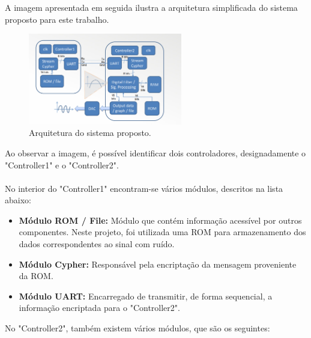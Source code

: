 \documentclass[12pt, a4paper]{article}
\begin{document}
A imagem apresentada em seguida ilustra a arquitetura simplificada do sistema proposto para este trabalho.\\

\begin{figure}[h]  %
    \centering
    \includegraphics[width=0.6\textwidth]{./images/architecture.png}  %
    \caption{Arquitetura do sistema proposto.}
    \label{fig:arquitetura}
\end{figure}

Ao observar a imagem, é possível identificar dois controladores, designadamente o "Controller1" e o "Controller2". \\ \\
No interior do "Controller1" encontram-se vários módulos, descritos na lista abaixo:

\begin{itemize}
    \item \textbf{Módulo ROM / File:} Módulo que contém informação acessível por outros componentes.  
    Neste projeto, foi utilizada uma ROM para armazenamento dos dados correspondentes ao sinal com ruído.
    
    \item \textbf{Módulo Cypher:} Responsável pela encriptação da mensagem proveniente da ROM.
    
    \item \textbf{Módulo UART:} Encarregado de transmitir, de forma sequencial, a informação encriptada para o "Controller2".
\end{itemize}

\vspace{2em} %


No "Controller2", também existem vários módulos, que são os seguintes:
\end{document}
